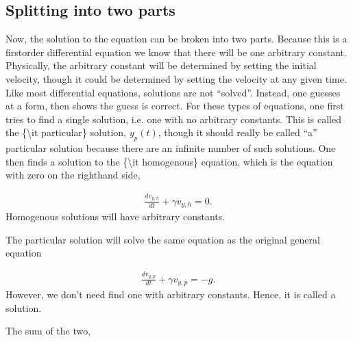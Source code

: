 \documentclass[letterpaper,10pt,english]{sphinxmanual}
\begin{document}
\subsection{Splitting into two parts}
\label{\detokenize{chapter2:splitting-into-two-parts}}
Now, the solution to the equation can be broken into two
parts. Because this is a first\sphinxhyphen{}order differential equation we know
that there will be one arbitrary constant. Physically, the arbitrary
constant will be determined by setting the initial velocity, though it
could be determined by setting the velocity at any given time. Like
most differential equations, solutions are not “solved”. Instead,
one guesses at a form, then shows the guess is correct. For these
types of equations, one first tries to find a single solution,
i.e. one with no arbitrary constants. This is called the \{\textbackslash{}it
particular\} solution, \(y_p(t)\), though it should really be called
“a” particular solution because there are an infinite number of such
solutions. One then finds a solution to the \{\textbackslash{}it homogenous\} equation,
which is the equation with zero on the right\sphinxhyphen{}hand side,




\begin{equation*}
\begin{split}
\begin{equation}
\frac{dv_{y,h}}{dt}+\gamma v_{y,h}=0.
\label{_auto7} \tag{7}
\end{equation}
\end{split}
\end{equation*}
Homogenous solutions will have arbitrary constants.

The particular solution will solve the same equation as the original
general equation




\begin{equation*}
\begin{split}
\begin{equation}
\frac{dv_{y,p}}{dt}+\gamma v_{y,p}=-g.
\label{_auto8} \tag{8}
\end{equation}
\end{split}
\end{equation*}
However, we don’t need find one with arbitrary constants. Hence, it is
called a  solution.

The sum of the two,
\end{document}
